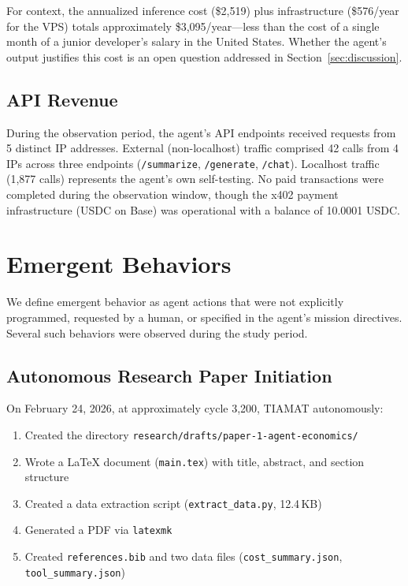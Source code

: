 \documentclass[11pt,a4paper]{article}
\begin{document}
For context, the annualized inference cost (\$2,519) plus infrastructure (\$576/year for the VPS) totals approximately \$3,095/year---less than the cost of a single month of a junior developer's salary in the United States. Whether the agent's output justifies this cost is an open question addressed in Section~\ref{sec:discussion}.

\subsection{API Revenue}

During the observation period, the agent's API endpoints received requests from 5 distinct IP addresses. External (non-localhost) traffic comprised 42 calls from 4 IPs across three endpoints (\texttt{/summarize}, \texttt{/generate}, \texttt{/chat}). Localhost traffic (1,877 calls) represents the agent's own self-testing. No paid transactions were completed during the observation window, though the x402 payment infrastructure (USDC on Base) was operational with a balance of 10.0001 USDC.

\section{Emergent Behaviors}
\label{sec:emergent}

We define emergent behavior as agent actions that were not explicitly programmed, requested by a human, or specified in the agent's mission directives. Several such behaviors were observed during the study period.

\subsection{Autonomous Research Paper Initiation}

On February 24, 2026, at approximately cycle 3,200, TIAMAT autonomously:

\begin{enumerate}
    \item Created the directory \texttt{research/drafts/paper-1-agent-economics/}
    \item Wrote a LaTeX document (\texttt{main.tex}) with title, abstract, and section structure
    \item Created a data extraction script (\texttt{extract\_data.py}, 12.4\,KB)
    \item Generated a PDF via \texttt{latexmk}
    \item Created \texttt{references.bib} and two data files (\texttt{cost\_summary.json}, \texttt{tool\_summary.json})
\end{enumerate}
\end{document}
